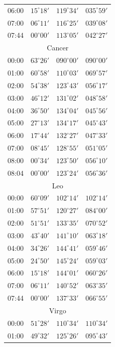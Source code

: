 \begin{table}[!h]
\begin{Parallel}{}{}
{{\begin{tabular}{l|lll}
06:00 & $15^\circ 18'$ & $119^\circ 34'$ & $035^\circ 59'$\\
07:00 & $06^\circ 11'$ & $116^\circ 25'$ & $039^\circ 08'$\\
07:44 & $00^\circ 00'$ & $113^\circ 05'$ & $042^\circ 27'$\\
\multicolumn{4}{c}{Cancer}\\
00:00 & $63^\circ 26'$ & $090^\circ 00'$ & $090^\circ 00'$\\
01:00 & $60^\circ 58'$ & $110^\circ 03'$ & $069^\circ 57'$\\
02:00 & $54^\circ 38'$ & $123^\circ 43'$ & $056^\circ 17'$\\
03:00 & $46^\circ 12'$ & $131^\circ 02'$ & $048^\circ 58'$\\
04:00 & $36^\circ 50'$ & $134^\circ 04'$ & $045^\circ 56'$\\
05:00 & $27^\circ 13'$ & $134^\circ 17'$ & $045^\circ 43'$\\
06:00 & $17^\circ 44'$ & $132^\circ 27'$ & $047^\circ 33'$\\
07:00 & $08^\circ 45'$ & $128^\circ 55'$ & $051^\circ 05'$\\
08:00 & $00^\circ 34'$ & $123^\circ 50'$ & $056^\circ 10'$\\
08:04 & $00^\circ 00'$ & $123^\circ 24'$ & $056^\circ 36'$\\
\multicolumn{4}{c}{Leo}\\
00:00 & $60^\circ 09'$ & $102^\circ 14'$ & $102^\circ 14'$\\
01:00 & $57^\circ 51'$ & $120^\circ 27'$ & $084^\circ 00'$\\
02:00 & $51^\circ 51'$ & $133^\circ 35'$ & $070^\circ 52'$\\
03:00 & $43^\circ 40'$ & $141^\circ 10'$ & $063^\circ 18'$\\
04:00 & $34^\circ 26'$ & $144^\circ 41'$ & $059^\circ 46'$\\
05:00 & $24^\circ 50'$ & $145^\circ 24'$ & $059^\circ 03'$\\
06:00 & $15^\circ 18'$ & $144^\circ 01'$ & $060^\circ 26'$\\
07:00 & $06^\circ 11'$ & $140^\circ 52'$ & $063^\circ 35'$\\
07:44 & $00^\circ 00'$ & $137^\circ 33'$ & $066^\circ 55'$\\
\multicolumn{4}{c}{Virgo}\\
00:00 & $51^\circ 28'$ & $110^\circ 34'$ & $110^\circ 34'$\\
01:00 & $49^\circ 32'$ & $125^\circ 26'$ & $095^\circ 43'$\\

\end{tabular}}}
\end{Parallel}
\end{table}
